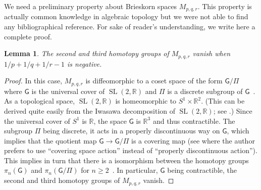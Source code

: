 \documentclass[12pt]{amsart}
\newtheorem{lemma}[theorem]{Lemma}
\theoremstyle{definition}
\renewcommand{\geq}{\geqslant}
\begin{document}
We need a preliminary property about Brieskorn spaces $M_{p,q,r}$. This property is actually common knowledge in algebraic topology but we were not able to find any bibliographical reference. For sake of reader's understanding, we write here a complete proof.

\begin{lemma}\label{lem:Briesk}
The second and third homotopy groups of $M_{p,q,r}$ vanish when $1/p + 1/q + 1/r - 1$ is negative.
\end{lemma}

\begin{proof}
In this case, $M_{p,q,r}$ is diffeomorphic to a coset space of the form $\mathsf{G}/\mathsf{\Pi}$ where $\mathsf{G}$ is the universal cover of $\operatorname{SL}(2,\mathbb R )$ and $\mathsf{\Pi}$ is a discrete subgroup of $\mathsf{G}$~\cite[Section 6]{milnor1975}. As a topological space, $\operatorname{SL}(2,\mathbb R)$ is homeomorphic to $S^1\times\mathbb{R}^2$. (This can be derived quite easily from the Iwasawa decomposition of $\operatorname{SL}(2,\mathbb R)$; see \cite{iwasawa}.) Since the universal cover of $S^1$ is $\mathbb{R}$, the space $\mathsf{G}$ is $\mathbb{R}^3$ and thus contractible. The subgroup $\mathsf{\Pi}$ being discrete, it acts in a properly discontinuous way on $\mathsf{G}$, which implies that the quotient map $\mathsf{G} \rightarrow \mathsf{G}/\mathsf{\Pi}$ is a covering map (see \cite[Proposition 1.40]{hatcher2005algebraic} where the author prefers to use ``covering space action'' instead of ``properly discontinuous action''). This implies in turn that there is a isomorphism between the homotopy groups $\pi_n(\mathsf{G})$ and $\pi_n(\mathsf{G}/\mathsf{\Pi})$ for $n\geq 2$~\cite[Proposition 4.1]{hatcher2005algebraic}. In particular, $\mathsf{G}$ being contractible, the second and third homotopy groups of $M_{p,q,r}$ vanish.
\end{proof}
\end{document}
